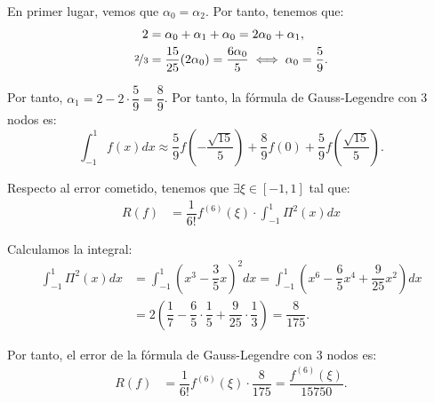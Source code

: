 \begin{ejercicio}
    En primer lugar, vemos que $\alpha_0=\alpha_2$. Por tanto, tenemos que:
    \begin{align*}
        2 &= \alpha_0 + \alpha_1 + \alpha_0 = 2\alpha_0 + \alpha_1,\\
        \nicefrac{2}{3} &= \dfrac{15}{25}(2\alpha_0) = \dfrac{6\alpha_0}{5} \iff \alpha_0 = \dfrac{5}{9}.
    \end{align*}

    Por tanto, $\alpha_1 = 2 - 2\cdot \dfrac{5}{9} = \dfrac{8}{9}$. Por tanto, la fórmula de Gauss-Legendre con 3 nodos es:
    \begin{equation*}
        \int_{-1}^{1} f(x) dx \approx \dfrac{5}{9} f\left(-\frac{\sqrt{15}}{5}\right) + \dfrac{8}{9} f(0) + \dfrac{5}{9} f\left(\frac{\sqrt{15}}{5}\right).
    \end{equation*}

    Respecto al error cometido, tenemos que $\exists \xi \in [-1, 1]$ tal que:
    \begin{align*}
        R(f) &= \dfrac{1}{6!}f^{(6)}(\xi) \cdot \int_{-1}^{1} \Pi^2(x) dx
    \end{align*}

    Calculamos la integral:
    \begin{align*}
        \int_{-1}^{1} \Pi^2(x) dx &= \int_{-1}^{1} \left(x^3 - \dfrac{3}{5}x\right)^2 dx = \int_{-1}^{1} \left(x^6 - \dfrac{6}{5}x^4 + \dfrac{9}{25}x^2\right) dx\\
        &= 2\left(\dfrac{1}{7} - \dfrac{6}{5}\cdot \dfrac{1}{5} + \dfrac{9}{25}\cdot \dfrac{1}{3}\right) = \dfrac{8}{175}.
    \end{align*}

    Por tanto, el error de la fórmula de Gauss-Legendre con 3 nodos es:
    \begin{align*}
        R(f) &= \dfrac{1}{6!}f^{(6)}(\xi) \cdot \dfrac{8}{175} = \dfrac{f^{(6)}(\xi)}{15750}.
    \end{align*}
\end{ejercicio}

